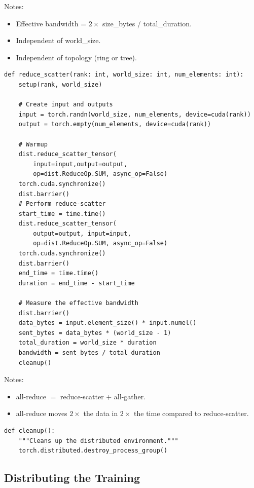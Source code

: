 \documentclass[12pt,twoside]{article}
\begin{document}
Notes: 

\begin{itemize}
    \item Effective bandwidth =  \(2 \times\)  size\_bytes / total\_duration.
    \item Independent of world\_size.
    \item Independent of topology (ring or tree).
\end{itemize}

\begin{verbatim}
def reduce_scatter(rank: int, world_size: int, num_elements: int):
    setup(rank, world_size)
    
    # Create input and outputs
    input = torch.randn(world_size, num_elements, device=cuda(rank))
    output = torch.empty(num_elements, device=cuda(rank))
    
    # Warmup
    dist.reduce_scatter_tensor(
        input=input,output=output, 
        op=dist.ReduceOp.SUM, async_op=False)
    torch.cuda.synchronize() 
    dist.barrier()
    # Perform reduce-scatter
    start_time = time.time()
    dist.reduce_scatter_tensor(
        output=output, input=input, 
        op=dist.ReduceOp.SUM, async_op=False)
    torch.cuda.synchronize()
    dist.barrier()
    end_time = time.time()
    duration = end_time - start_time 
    
    # Measure the effective bandwidth
    dist.barrier()
    data_bytes = input.element_size() * input.numel()
    sent_bytes = data_bytes * (world_size - 1)
    total_duration = world_size * duration
    bandwidth = sent_bytes / total_duration
    cleanup()  
\end{verbatim}

Notes:

\begin{itemize}
    \item all-reduce \(=\) reduce-scatter \(+\) all-gather.
    \item all-reduce moves \(2 \times\) the data in \(2 \times\) the time compared to reduce-scatter.
\end{itemize}

\begin{verbatim}
def cleanup():
    """Cleans up the distributed environment."""
    torch.distributed.destroy_process_group()
\end{verbatim}

\subsection*{Distributing the Training}
\end{document}

